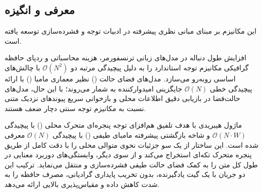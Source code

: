 \subsection{معرفی و انگیزه}
این مکانیزم بر مبنای مبانی نظری پیشرفته در ادبیات توجه و فشرده‌سازی \cite{ren2024samba} توسعه یافته است.

افزایش طول دنباله در مدل‌های زبانی ترنسفورمر، هزینه محاسباتی و ردپای حافظه گرافیکی مکانیزم توجه استاندارد را به دلیل پیچیدگی مرتبه دو $\mathcal{O}(N^2)$ با چالش‌های اساسی روبه‌رو می‌سازد. مدل‌های فضای حالت () نظیر معماری مامبا () با ارائه پیچیدگی خطی $\mathcal{O}(N)$ جایگزینی امیدوارکننده به شمار می‌روند؛ با این حال، مدل‌های حالت‌فضا در بازیابی دقیق اطلاعات محلی و بازخوانی سریع پیوندهای نزدیک متنی نسبت به مکانیزم توجه سنتی دچار ضعف هستند.

ماژول هیبریدی  با هدف تلفیق هم‌افزای توجه پنجره‌ای متحرک محلی () با پیچیدگی $\mathcal{O}(N \cdot W)$ و شاخه بازگشتی پیشرفته مامبای طیفی () با پیچیدگی $\mathcal{O}(N)$ معرفی شده است. این ساختار از یک سو جزئیات نحوی متوالی محلی را با دقت کامل از طریق پنجره متحرک تکه‌ای استخراج می‌کند و از سوی دیگر، وابستگی‌های دوربرد معنایی در طول کل متن را به کمک فضای حالت طیفی فشرده‌سازی و منتقل می‌نماید. ترکیب این دو جریان با یک گیت یادگیرنده، بدون تخریب پایداری گرادیانی، مصرف حافظه را به شدت کاهش داده و مقیاس‌پذیری بالایی ارائه می‌دهد.
